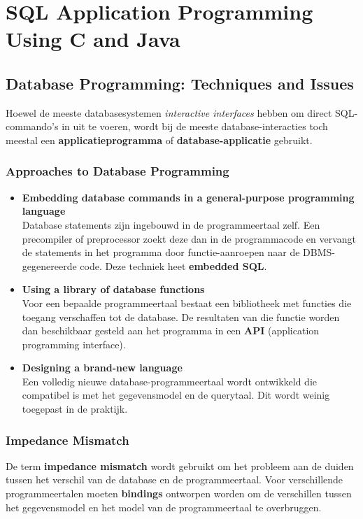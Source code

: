 \chapter{SQL Application Programming Using C and Java}
\section{Database Programming: Techniques and Issues}
Hoewel de meeste databasesystemen \textit{interactive interfaces} hebben om direct SQL-commando's in uit te voeren, wordt bij de meeste database-interacties toch meestal een \textbf{applicatieprogramma} of \textbf{database-applicatie} gebruikt. 

\subsection{Approaches to Database Programming}
\begin{itemize}
	\item \textbf{Embedding database commands in a general-purpose programming language}\\
	Database statements zijn ingebouwd in de programmeertaal zelf. Een precompiler of preprocessor zoekt deze dan in de programmacode en vervangt de statements in het programma door functie-aanroepen naar de DBMS-gegenereerde code. Deze techniek heet \textbf{embedded SQL}.
	\item \textbf{Using a library of database functions}\\
	Voor een bepaalde programmeertaal bestaat een bibliotheek met functies die toegang verschaffen tot de database. De resultaten van die functie worden dan beschikbaar gesteld aan het programma in een \textbf{API} (application programming interface).
	\item \textbf{Designing a brand-new language}\\
	Een volledig nieuwe database-programmeertaal wordt ontwikkeld die compatibel is met het gegevensmodel en de querytaal. Dit wordt weinig toegepast in de praktijk.
\end{itemize}

\subsection{Impedance Mismatch}
De term \textbf{impedance mismatch} wordt gebruikt om het probleem aan de duiden tussen het verschil van de database en de programmeertaal. 
Voor verschillende programmeertalen moeten \textbf{bindings} ontworpen worden om de verschillen tussen het gegevensmodel en het model van de programmeertaal te overbruggen.


